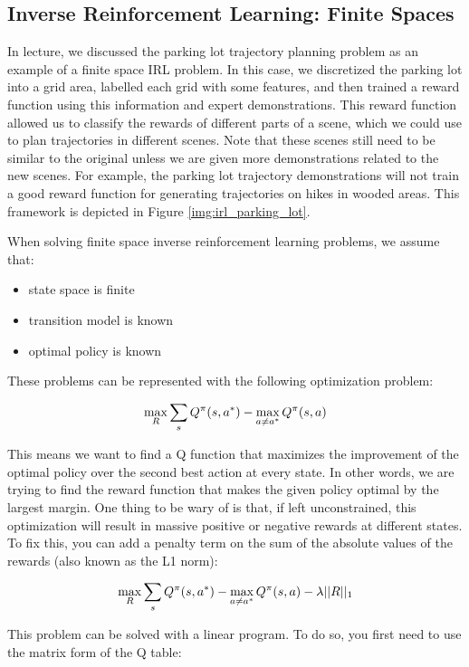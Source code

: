 \documentclass[11pt]{article}
\begin{document}
\subsection{Inverse Reinforcement Learning: Finite Spaces} 
In lecture, we discussed the parking lot trajectory planning problem as an example of a finite space IRL problem. In this case, we discretized the parking lot into a grid area, labelled each grid with some features, and then trained a reward function using this information and expert demonstrations. This reward function allowed us to classify the rewards of different parts of a scene, which we could use to plan trajectories in different scenes. Note that these scenes still need to be similar to the original unless we are given more demonstrations related to the new scenes. For example, the parking lot trajectory demonstrations will not train a good reward function for generating trajectories on hikes in wooded areas. This framework is depicted in Figure \ref{img:irl_parking_lot}.

When solving finite space inverse reinforcement learning problems, we assume that:
\begin{itemize}
    \item state space is finite
    \item transition model is known
    \item optimal policy is known
\end{itemize}

These problems can be represented with the following optimization problem:

$$
\max\limits_R \Large{ \sum\limits_s Q^{\pi}(s, a^*) - \max\limits_{a \neq a^*} Q^{\pi} (s,a) \Large}
$$

This means we want to find a Q function that maximizes the improvement of the optimal policy over the second best action at every state. In other words, we are trying to find the reward function that makes the given policy optimal by the largest margin. One thing to be wary of is that, if left unconstrained, this optimization will result in massive positive or negative rewards at different states. To fix this, you can add a penalty term on the sum of the absolute values of the rewards (also known as the L1 norm):

$$
\max\limits_R \Large{ \sum\limits_s Q^{\pi}(s, a^*) - \max\limits_{a \neq a^*} Q^{\pi} (s,a) \Large}
- \lambda ||R||_1
$$

This problem can be solved with a linear program. To do so, you first need to use the matrix form of the Q table:
\end{document}

